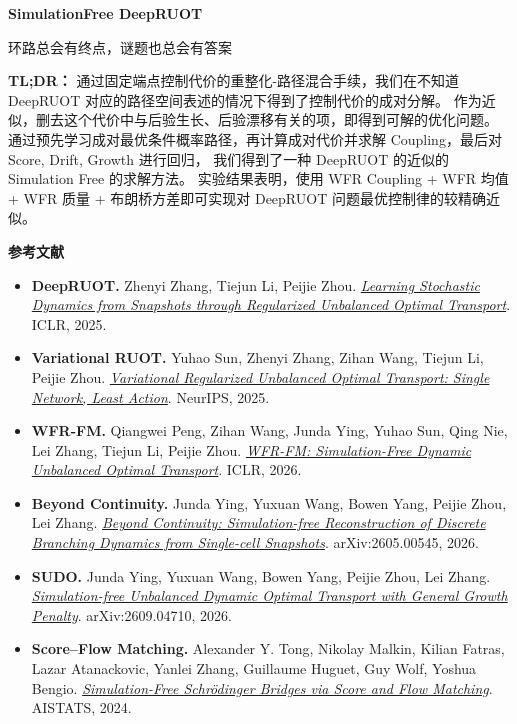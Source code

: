 \documentclass[UTF8,a4paper,11pt,fontset=fandol]{ctexart}
\begin{document}
\begin{center}
{\LARGE\bfseries SimulationFree DeepRUOT\par}
\vspace{1.2em}
{\large\kaishu 环路总会有终点，谜题也总会有答案\par}
\end{center}
\vspace{0.6em}

\noindent\textbf{TL;DR：}
通过固定端点控制代价的重整化-路径混合手续，我们在不知道 DeepRUOT 对应的路径空间表述的情况下得到了控制代价的成对分解。
作为近似，删去这个代价中与后验生长、后验漂移有关的项，即得到可解的优化问题。
通过预先学习成对最优条件概率路径，再计算成对代价并求解 Coupling，最后对 Score, Drift, Growth 进行回归，
我们得到了一种 DeepRUOT 的近似的 Simulation Free 的求解方法。
实验结果表明，使用 WFR Coupling + WFR 均值 + WFR 质量 + 布朗桥方差即可实现对 DeepRUOT 问题最优控制律的较精确近似。

\vspace{1em}
\noindent\textbf{参考文献}
\begin{small}
\begin{itemize}
\setlength{\itemsep}{0.65em}
\setlength{\parsep}{0pt}
\item \textbf{DeepRUOT.}
Zhenyi Zhang, Tiejun Li, Peijie Zhou.
\emph{\href{https://openreview.net/forum?id=gQlxd3Mtru}{Learning Stochastic Dynamics from Snapshots through Regularized Unbalanced Optimal Transport}}.
ICLR, 2025.

\item \textbf{Variational RUOT.}
Yuhao Sun, Zhenyi Zhang, Zihan Wang, Tiejun Li, Peijie Zhou.
\emph{\href{https://arxiv.org/abs/2505.11823}{Variational Regularized Unbalanced Optimal Transport: Single Network, Least Action}}.
NeurIPS, 2025.

\item \textbf{WFR-FM.}
Qiangwei Peng, Zihan Wang, Junda Ying, Yuhao Sun, Qing Nie, Lei Zhang, Tiejun Li, Peijie Zhou.
\emph{\href{https://arxiv.org/abs/2601.06810}{WFR-FM: Simulation-Free Dynamic Unbalanced Optimal Transport}}.
ICLR, 2026.

\item \textbf{Beyond Continuity.}
Junda Ying, Yuxuan Wang, Bowen Yang, Peijie Zhou, Lei Zhang.
\emph{\href{https://arxiv.org/abs/2605.00545}{Beyond Continuity: Simulation-free Reconstruction of Discrete Branching Dynamics from Single-cell Snapshots}}.
arXiv:2605.00545, 2026.

\item \textbf{SUDO.}
Junda Ying, Yuxuan Wang, Bowen Yang, Peijie Zhou, Lei Zhang.
\emph{\href{https://arxiv.org/abs/2609.04710}{Simulation-free Unbalanced Dynamic Optimal Transport with General Growth Penalty}}.
arXiv:2609.04710, 2026.

\item \textbf{Score--Flow Matching.}
Alexander Y. Tong, Nikolay Malkin, Kilian Fatras, Lazar Atanackovic, Yanlei Zhang, Guillaume Huguet, Guy Wolf, Yoshua Bengio.
\emph{\href{https://proceedings.mlr.press/v238/tong24a.html}{Simulation-Free Schr\"odinger Bridges via Score and Flow Matching}}.
AISTATS, 2024.
\end{itemize}
\end{small}
\end{document}
